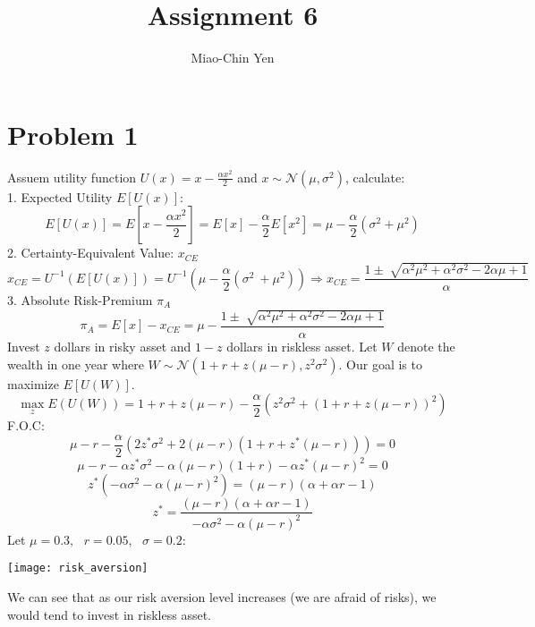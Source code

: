 \documentclass{article}
\title{Assignment 6}
\author{Miao-Chin Yen}
\begin{document}
\maketitle

\section*{Problem 1}
\hspace{1em}Assuem utility function $U(x) = x-\frac{\alpha x^2}{2}$ and $x \sim \mathcal{N}(\mu,\sigma^{2})$, calculate:\\
1. Expected Utility $E[U(x)]$:\\
$$E[U(x)] = E[x-\frac{\alpha x^2}{2}] = E[x]-\frac{\alpha}{2}E[x^2] = \mu-\frac{\alpha}{2}(\sigma^2 + \mu^2)$$
2. Certainty-Equivalent Value: $x_{CE}$
$$ x_{CE} = U^{-1}(E[U(x)]) = U^{-1}( \mu-\frac{\alpha}{2}(\sigma^2\ + \mu^2)) \Rightarrow x_{CE} = \frac{1 \pm\sqrt[]{\alpha^2\mu^2+\alpha^2\sigma^2-2\alpha\mu +1}}{\alpha}
$$
3. Absolute Risk-Premium $\pi_{A}$
$$\pi_{A} =E[x]-x_{CE} = \mu-\frac{1 \pm\sqrt[]{\alpha^2\mu^2+\alpha^2\sigma^2-2\alpha\mu +1}}{\alpha} $$
Invest $z$ dollars in risky asset and $1-z$ dollars in riskless asset. Let $W$ denote the wealth in one year where $W \sim \mathcal{N}(1+r+z(\mu-r),z^2\sigma^{2})$. 
Our goal is to maximize $E[U(W)]$.
$$ \max_{z} E(U(W)) = 1+r+z(\mu-r) -\frac{\alpha}{2}(z^2\sigma^{2} + (1+r+z(\mu-r))^2 )  $$
F.O.C:
$$ \mu-r -\frac{\alpha}{2}(2z^{*}\sigma^2 + 2(\mu-r)(1+r+z^{*}(\mu-r)))=0$$
$$\mu-r -\alpha z^{*} \sigma^2 -\alpha (\mu-r)(1+r)-\alpha z^{*}(\mu-r)^2 = 0$$
$$z^{*}(-\alpha \sigma^2 - \alpha(\mu-r)^2) = (\mu-r)(\alpha + \alpha r-1) $$
$$z^{*}= \frac{(\mu-r)(\alpha + \alpha r-1)}{-\alpha \sigma^2 - \alpha(\mu-r)^2}$$
Let $\mu=0.3,\text{ }r = 0.05,\text{ }\sigma = 0.2$:
\begin{center}
\texttt{[image: risk\_aversion]}
\end{center}
We can see that as our risk aversion level increases (we are afraid of risks), we would tend to invest in riskless asset.
\end{document}
